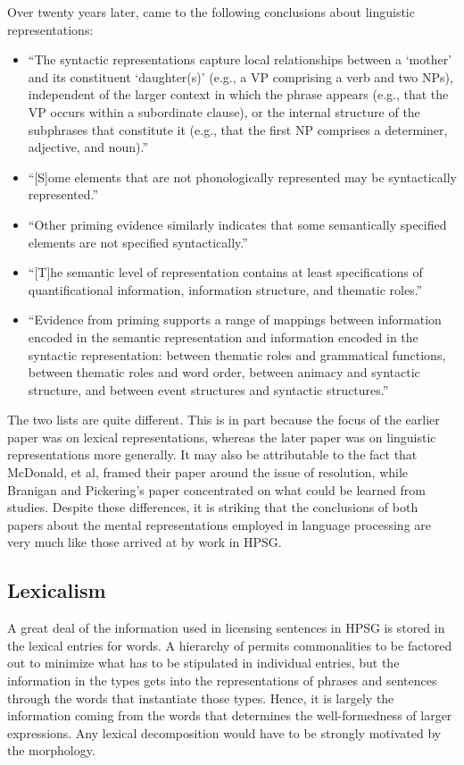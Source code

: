 \documentclass[a4paper]{article}
\begin{document}
Over twenty years later, \citet{BraniganPickering2017} came to the following conclusions about linguistic representations:
\begin{itemize}
\item ``The syntactic representations capture local relationships
between a `mother' and its constituent `daughter(s)' (e.g.,
a VP comprising a verb and two NPs), independent of the
larger context in which the phrase appears (e.g., that the VP
occurs within a subordinate clause), or the internal structure
of the subphrases that constitute it (e.g., that the
first NP comprises a determiner, adjective, and noun).''
\item ``[S]ome elements that are not phonologically represented may
be syntactically represented.''
\item ``Other priming evidence similarly indicates that some
semantically specified elements are not specified syntactically.''
\item ``[T]he semantic level of representation
contains at least specifications of quantificational information,
information structure, and thematic roles.''
\item ``Evidence
from priming supports a range of mappings between information encoded in the semantic representation and information encoded in the syntactic representation: between
thematic roles and grammatical functions, between thematic roles and word order, between animacy and syntactic
structure, and between event structures and syntactic
structures.''
\end{itemize}
The two lists are quite different.  This is in part because the focus of the earlier paper was on lexical representations, whereas the later paper was on linguistic representations more generally.  It may also be attributable to the fact that McDonald, et al, framed their paper around the issue of  resolution, while Branigan and Pickering's paper concentrated on what could be learned from  studies.  Despite these differences, it is striking that the conclusions of both papers about the mental representations employed in language processing are very much like those arrived at by work in HPSG.

\subsection{Lexicalism}

A great deal of the information used in licensing sentences in HPSG is stored in the lexical entries for words.  A hierarchy of  permits commonalities to be factored out to minimize what has to be stipulated in individual entries, but the information in the types gets into the representations of phrases and sentences through the words that instantiate those types. Hence, it is largely the information coming from the words that determines the well-formedness of larger expressions.  Any lexical decomposition would have to be strongly motivated by the morphology.
\end{document}
